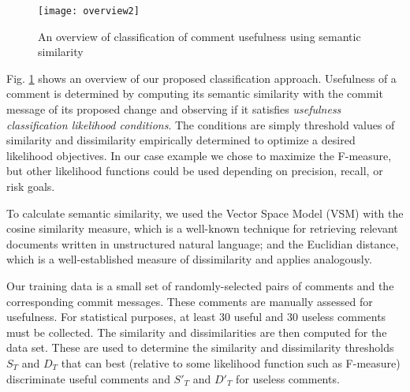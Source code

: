 \begin{figure}[!t]
\centering
\texttt{[image: overview2]}
\caption{An overview of classification of comment usefulness using semantic similarity}
\label{fig:overview}
\end{figure}

Fig. \ref{fig:overview} shows an overview of our proposed classification approach.
Usefulness of a comment is determined by computing its semantic similarity with the commit message of its proposed change and observing if it satisfies \emph{usefulness classification likelihood conditions}.
The conditions are simply threshold values of similarity and dissimilarity empirically determined to optimize a desired likelihood objectives.
In our case example we chose to maximize the F-measure, but other likelihood functions could be used depending on precision, recall, or risk goals.

To calculate semantic similarity, we used the Vector Space Model (VSM) with the cosine similarity measure, which is a well-known technique for retrieving relevant documents written in unstructured natural language\cite{did}; and the Euclidian distance, which is a well-established measure of dissimilarity and applies analogously\cite{dfdf}.

Our training data is a small set of randomly-selected pairs of comments and the corresponding commit messages.
These comments are manually assessed for usefulness.
For statistical purposes, at least 30 useful and 30 useless comments must be collected.
The similarity and dissimilarities are then computed for the data set.
These are used to determine the similarity and dissimilarity thresholds $S_T$ and $D_T$ that can best (relative to some likelihood function such as F-measure) discriminate useful comments and $S'_T$ and $D'_T$ for useless comments.


